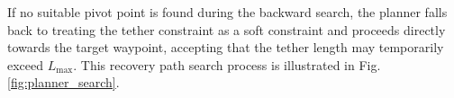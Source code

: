 If no suitable pivot point is found during the backward search, the planner falls back to treating the tether constraint as a soft constraint and proceeds directly towards the target waypoint, accepting that the tether length may temporarily exceed $L_{\text{max}}$. This recovery path search process is illustrated in Fig. \ref{fig:planner_search}.







